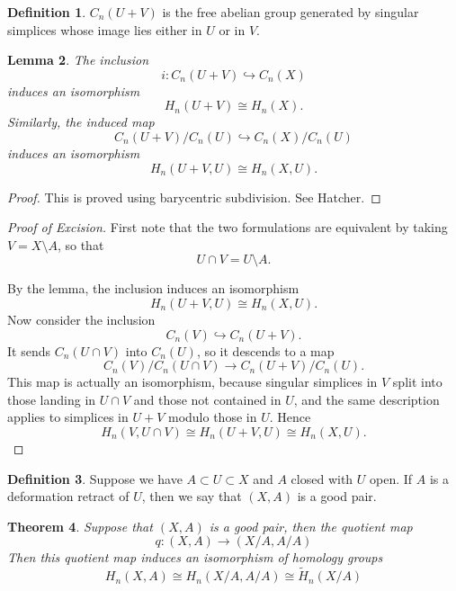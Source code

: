 \documentclass[11pt,a4paper]{article}
\theoremstyle{definition}
\newtheorem{definition}{Definition}[section]
\theoremstyle{plain}
\newtheorem{theorem}[definition]{Theorem}
\newtheorem{lemma}[definition]{Lemma}
\theoremstyle{remark}
\newcommand{\1}{\mathbbm{1}}
\begin{document}
\begin{definition}
    $C_n(U+V)$ is the free abelian group generated by singular simplices whose image lies either in $U$ or in $V$.
\end{definition}

\begin{lemma}
    The inclusion
    \[
    i\colon C_n(U+V)\hookrightarrow C_n(X)
    \]
    induces an isomorphism
    \[
    H_n(U+V)\cong H_n(X).
    \]
    Similarly, the induced map
    \[
    C_n(U+V)/C_n(U)\hookrightarrow C_n(X)/C_n(U)
    \]
    induces an isomorphism
    \[
    H_n(U+V,U)\cong H_n(X,U).
    \]
\end{lemma}

\begin{proof}
    This is proved using barycentric subdivision. See Hatcher.
\end{proof}

\begin{proof}[Proof of Excision]
    First note that the two formulations are equivalent by taking $V=X\setminus A$, so that
    \[
    U\cap V = U\setminus A.
    \]

    By the lemma, the inclusion induces an isomorphism
    \[
    H_n(U+V,U)\cong H_n(X,U).
    \]
    Now consider the inclusion
    \[
    C_n(V)\hookrightarrow C_n(U+V).
    \]
    It sends $C_n(U\cap V)$ into $C_n(U)$, so it descends to a map
    \[
    C_n(V)/C_n(U\cap V)\to C_n(U+V)/C_n(U).
    \]
    This map is actually an isomorphism, because singular simplices in $V$ split into those landing in $U\cap V$
    and those not contained in $U$, and the same description applies to simplices in $U+V$ modulo those in $U$.
    Hence
    \[
    H_n(V,U\cap V)\cong H_n(U+V,U)\cong H_n(X,U).
    \]
\end{proof}

\begin{definition}
    Suppose we have $A \subset U \subset X$ and $A$ closed with $U$ open. If $A$ is a deformation retract of $U$, 
    then we say that $(X,A)$ is a good pair. 
\end{definition}

\begin{theorem}
    Suppose that $(X,A)$ is a good pair, then the quotient map 
    $$q \colon (X, A) \to (X/A, A/A)$$
    Then this quotient map induces an isomorphism of homology groups 
    $$H_n(X, A) \cong H_n(X/A, A/A) \cong \tilde{H}_n(X/A)$$  
\end{theorem}
\end{document}
